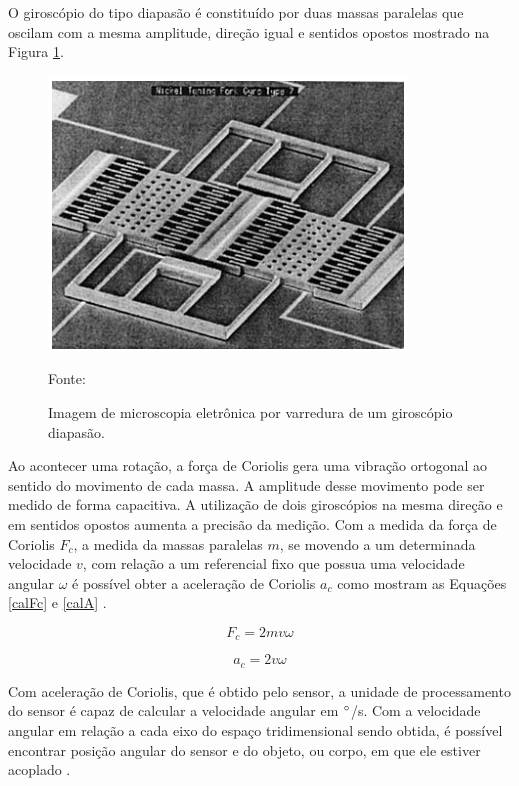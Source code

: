 			O giroscópio do tipo diapasão é constituído por duas massas paralelas que oscilam com a mesma amplitude, direção igual e sentidos opostos mostrado na Figura \ref{gyro}.
			
			\begin{figure}[h!]
				\centering
				\includegraphics[keepaspectratio=true,scale=0.7
				]{figuras/diapasao.png}
				\caption{ Imagem de microscopia eletrônica por varredura de um giroscópio diapasão.}
				Fonte: \cite{forhan2010}
				\label{gyro}	
			\end{figure}
			
			Ao acontecer uma rotação, a força de Coriolis gera uma vibração ortogonal ao sentido do movimento de cada massa. A amplitude desse movimento pode ser medido de forma capacitiva. A utilização de dois giroscópios na mesma direção e em sentidos opostos aumenta a precisão da medição. Com a medida da força de Coriolis  $F_{c}$, a medida da massas paralelas $m$, se movendo a um determinada velocidade $v$, com relação a um referencial fixo que possua uma velocidade angular $ \omega $ é possível obter a aceleração de Coriolis $a_{c}$ como mostram as Equações \ref{calFc} e \ref{calA} \cite{forhan2010}.
			
			\begin{equation}
			F_{c} = 2mv\omega
			\label{calFc}
			\end{equation}
			
			\begin{equation}
			a_{c} = 2v\omega
			\label{calA}
			\end{equation}
			
			Com aceleração de Coriolis, que é obtido pelo sensor, a unidade de processamento do sensor é capaz de calcular a velocidade angular em $\degree$/s. Com a velocidade angular em relação a cada eixo do espaço tridimensional sendo obtida, é possível encontrar posição angular do sensor e do objeto, ou corpo, em que ele estiver acoplado \cite{forhan2010}\cite{moyses2013}. 
			
